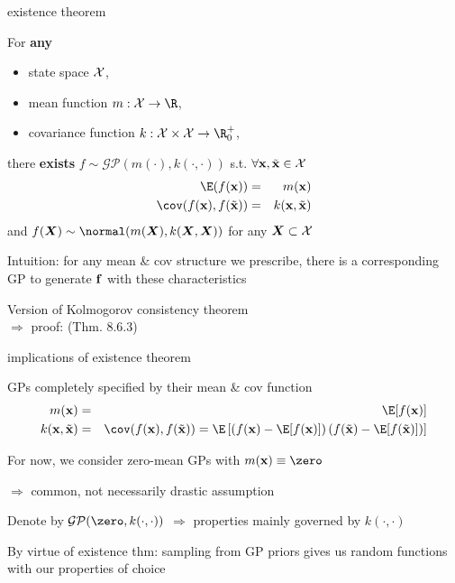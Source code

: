 \documentclass[11pt,compress,t,notes=noshow, xcolor=table]{beamer}
\begin{document}
\begin{framei}[sep=L]{existence theorem}
\item For \textbf{any} 
\begin{itemize}
\item state space $\mathcal{X}$,
\item mean function $m: \Xspace \rightarrow \R$,
\item covariance function $k: \Xspace \times \Xspace \rightarrow \R^+_0$, 
\end{itemize}
\vfill
there \textbf{exists} $f \sim \mathcal{GP}(m(\cdot), k(\cdot, \cdot))$ s.t. $\forall \mathbf{x}, \tilde{\mathbf{x}} \in \mathcal{X}$
\begin{eqnarray*}
\E(\fx) &=& m(\xv) \\
\cov(\fx, f(\tilde{\xv})) &=& k(\xv, \tilde{\xv})
\end{eqnarray*}
and $f(\bm{X}) \sim \normal(m(\bm{X}), k(\bm{X}, \bm{X}))$ for any $\bm{X} \subset \mathcal{X}$
\item Intuition: for any mean \& cov structure we prescribe, there is a corresponding GP to generate $\mathbf{f}$ with these characteristics
\item Version of Kolmogorov consistency theorem  \\
$\Rightarrow$ proof:  (Thm. 8.6.3)
\end{framei}

\begin{framei}[sep=L]{implications of existence theorem}
\item GPs completely specified by their mean \& cov function
\begin{eqnarray*}
m(\xv) &=& \E[f(\xv)] \\
k(\xv, \tilde{\xv}) &=& \cov(\fx, f(\tilde{\xv})) = \E \left[\left( f(\xv) - \E[f(\xv)] \right) \left( f(\tilde{\xv}) - \E[f(\tilde{\xv})] \right) \right]
\end{eqnarray*}
\item For now, we consider zero-mean GPs with $m(\xv) \equiv \zero$ 

$\Rightarrow$ common, not necessarily drastic assumption 
\item Denote by $\mathcal{GP}(\zero, k(\cdot, \cdot))$ $\Rightarrow$ properties mainly governed by $k(\cdot, \cdot)$
\item By virtue of existence thm: sampling from GP priors gives us random functions with our properties of choice
\end{framei}
\end{document}
